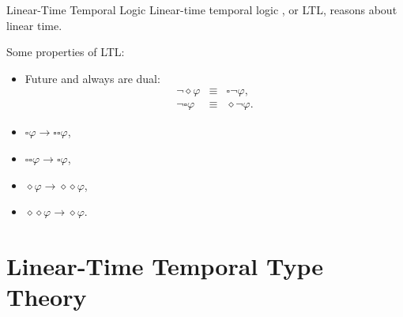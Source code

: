 \begin{frame}{Linear-Time Temporal Logic}
    Linear-time temporal logic \cite{DBLP:conf/focs/Pnueli77}, or LTL, reasons about linear time.
    
    Some properties of LTL:
    \begin{itemize}
        \item Future and always are dual:
        \begin{eqnarray*}
        \neg\diamond\varphi &\equiv& \square\neg\varphi, \\
        \neg\square\varphi &\equiv& \diamond\neg\varphi.
        \end{eqnarray*}
        \item $\square\varphi \rightarrow \square\square\varphi$,
        \item $\square\square\varphi \rightarrow \square\varphi$,
        \item $\diamond\varphi \rightarrow \diamond\diamond\varphi$, 
        \item $\diamond\diamond\varphi \rightarrow \diamond\varphi$.
    \end{itemize}
\end{frame}

\section{Linear-Time Temporal Type Theory}

